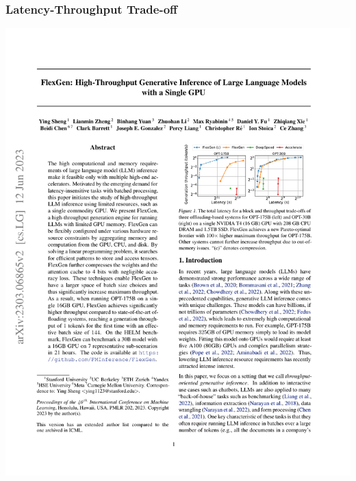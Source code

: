 \documentclass[12pt,aspectratio=169]{beamer}
\begin{document}
    \begin{frame}
        \frametitle{Latency-Throughput Trade-off}

        \centering
        \includegraphics[page=1,trim=316.48bp 478.62bp 82.31bp 204.56bp,clip,scale=1.1]{paper.pdf}
    \end{frame}
\end{document}

